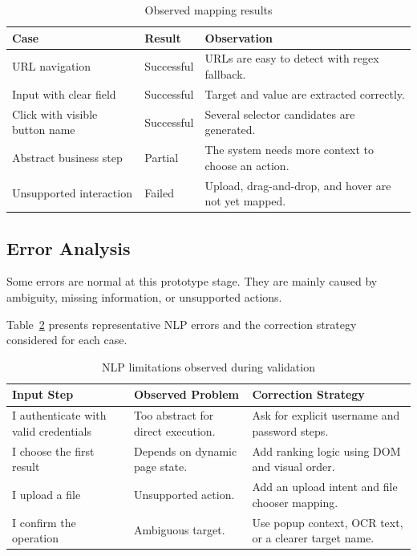 \begin{table}[H]
	\centering
	\caption{Observed mapping results}
	\label{tab:observed_mapping_results}
	\renewcommand{\arraystretch}{1.3}
	\small
	\begin{tabularx}{\textwidth}{|X|X|X|}
		\hline
		\rowcolor{gray!20}
		\textbf{Case} & \textbf{Result} & \textbf{Observation} \\ \hline
		URL navigation & Successful & URLs are easy to detect with regex fallback. \\ \hline
		Input with clear field & Successful & Target and value are extracted correctly. \\ \hline
		Click with visible button name & Successful & Several selector candidates are generated. \\ \hline
		Abstract business step & Partial & The system needs more context to choose an action. \\ \hline
		Unsupported interaction & Failed & Upload, drag-and-drop, and hover are not yet mapped. \\ \hline
	\end{tabularx}
\end{table}

\subsection{Error Analysis}
\label{subsec:nlp_error_analysis}

Some errors are normal at this prototype stage. They are mainly caused by ambiguity, missing information, or unsupported actions.

Table~\ref{tab:nlp_error_analysis} presents representative NLP errors and the correction strategy considered for each case.

\begin{table}[H]
	\centering
	\caption{NLP limitations observed during validation}
	\label{tab:nlp_error_analysis}
	\renewcommand{\arraystretch}{1.3}
	\small
	\begin{tabularx}{\textwidth}{|X|X|X|}
		\hline
		\rowcolor{gray!20}
		\textbf{Input Step} & \textbf{Observed Problem} & \textbf{Correction Strategy} \\ \hline
		I authenticate with valid credentials & Too abstract for direct execution. & Ask for explicit username and password steps. \\ \hline
		I choose the first result & Depends on dynamic page state. & Add ranking logic using DOM and visual order. \\ \hline
		I upload a file & Unsupported action. & Add an upload intent and file chooser mapping. \\ \hline
		I confirm the operation & Ambiguous target. & Use popup context, OCR text, or a clearer target name. \\ \hline
	\end{tabularx}
\end{table}

